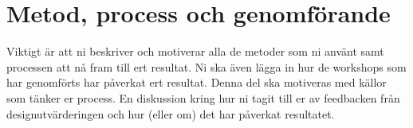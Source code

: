 \section{Metod, process och genomförande}
Viktigt är att ni beskriver och motiverar alla de metoder som ni använt samt processen att nå fram till ert resultat. Ni ska även lägga in hur de workshops som har genomförts har påverkat ert resultat. Denna del ska motiveras med källor som tänker er process. En diskussion kring hur ni tagit till er av feedbacken från designutvärderingen och hur (eller om) det har påverkat resultatet.